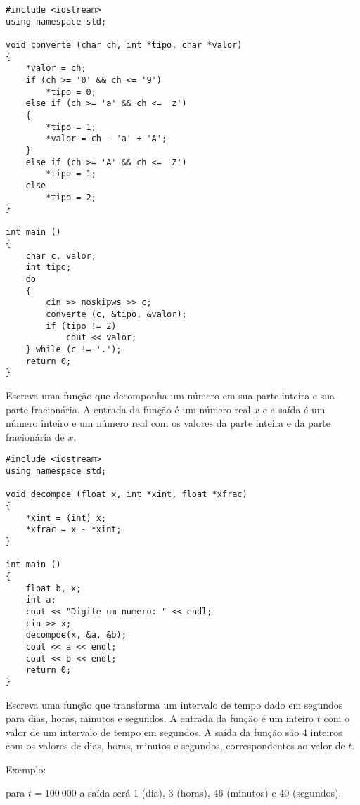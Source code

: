 \documentclass[a4paper]{memoir}
\begin{document}
\begin{sol}
\begin{lstlisting}
#include <iostream>
using namespace std;

void converte (char ch, int *tipo, char *valor)
{
    *valor = ch;
    if (ch >= '0' && ch <= '9')
        *tipo = 0;
    else if (ch >= 'a' && ch <= 'z')
    {
        *tipo = 1;
        *valor = ch - 'a' + 'A';
    }
    else if (ch >= 'A' && ch <= 'Z')
        *tipo = 1;
    else
        *tipo = 2;
}

int main ()
{
    char c, valor;
    int tipo;
    do
    {
        cin >> noskipws >> c;
        converte (c, &tipo, &valor);
        if (tipo != 2)
            cout << valor;
    } while (c != '.');
    return 0;
}
\end{lstlisting}
\end{sol}

\newpage

\begin{prob}\label{prob216.cpp}
Escreva uma função que decomponha um número em sua parte inteira e sua parte fracionária. A entrada da função é um número real $x$ e a saída é um número inteiro e um número real com os valores da parte inteira e da parte fracionária de $x$.
\end{prob}

\begin{sol}
\begin{lstlisting}
#include <iostream>
using namespace std;

void decompoe (float x, int *xint, float *xfrac)
{
    *xint = (int) x;
    *xfrac = x - *xint;
}

int main ()
{
    float b, x;
    int a;
    cout << "Digite um numero: " << endl;
    cin >> x;
    decompoe(x, &a, &b);
    cout << a << endl;
    cout << b << endl;
    return 0;
}
\end{lstlisting}
\end{sol}

\begin{prob}\label{prob217.cpp}
Escreva uma função que transforma um intervalo de tempo dado em segundos para dias, horas, minutos e segundos. A entrada da função é um inteiro $t$ com o valor de um intervalo de tempo em segundos. A saída da função são $4$ inteiros com os valores de dias, horas, minutos e segundos, correspondentes ao valor de $t$.

Exemplo:

para $t = 100\ 000$ a saída será 1 (dia), 3 (horas), 46 (minutos) e 40 (segundos).
\end{prob}
\end{document}
